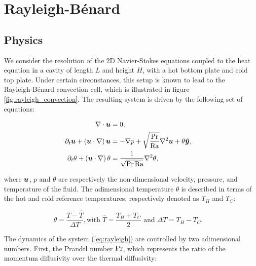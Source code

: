 \chapter{Rayleigh-B\'enard}

\section{Physics}

We consider the resolution of the 2D Navier-Stokes equations coupled to the heat equation in a cavity of length $L$ and height $H$, with a hot bottom plate and cold top plate. Under certain circonstances, this setup is known to lead to the Rayleigh-B\'enard convection cell, which is illustrated in figure \ref{fig:rayleigh_convection}. The resulting system is driven by the following set of equations:

\begin{equation}
\label{eq:rayleigh}
\begin{split}
	\nabla \cdot \bm{u} 						&= 0, \\
	\partial_t \bm{u} + (\bm{u} \cdot \nabla) \, \bm{u} 	&= -\nabla p + \sqrt{\frac{\text{Pr}}{\text{Ra}}} \nabla^2 \bm{u} + \theta \bm{\hat{y}}, \\
	\partial_t \theta + (\bm{u} \cdot \nabla) \, \theta 	&= \frac{1}{\sqrt{\text{Pr} \, \text{Ra}}} \nabla^2 \theta,
\end{split}
\end{equation}

where $\bm{u}$, $p$ and $\theta$ are respectively the non-dimensional velocity, pressure, and temperature  of the fluid. The adimensional temperature $\theta$ is described in terms of the hot and cold reference temperatures, respectively denoted as $T_H$ and $T_C$: 

\begin{equation*}
	\theta = \frac{T - \hat{T}}{\Delta T}, \text{with } \hat{T} = \frac{T_H + T_C}{2} \text{ and } \Delta T = T_H - T_C.
\end{equation*}

The dynamics of the system (\ref{eq:rayleigh}) are controlled by two adimensional numbers. First, the Prandtl number $\text{Pr}$, which represents the ratio of the momentum diffusivity over the thermal diffusivity: 

